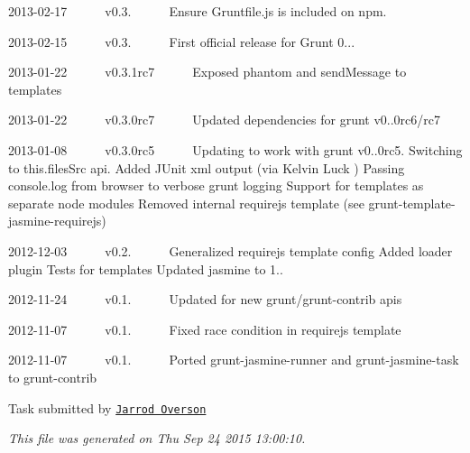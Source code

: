 \begin{DoxyItemize}
\item 2013-\/02-\/17   v0.3.   \+Ensure Gruntfile.\+js is included on npm.
\item 2013-\/02-\/15   v0.3.   \+First official release for Grunt 0...
\item 2013-\/01-\/22   v0.3.\+1rc7   \+Exposed phantom and send\+Message to templates
\item 2013-\/01-\/22   v0.3.\+0rc7   \+Updated dependencies for grunt v0..\+0rc6/rc7
\item 2013-\/01-\/08   v0.3.\+0rc5   \+Updating to work with grunt v0..\+0rc5. Switching to this.\+files\+Src api. Added J\+Unit xml output (via Kelvin Luck ) Passing console.\+log from browser to verbose grunt logging Support for templates as separate node modules Removed internal requirejs template (see grunt-\/template-\/jasmine-\/requirejs)
\item 2012-\/12-\/03   v0.2.   \+Generalized requirejs template config Added loader plugin Tests for templates Updated jasmine to 1..
\item 2012-\/11-\/24   v0.1.   \+Updated for new grunt/grunt-\/contrib apis
\item 2012-\/11-\/07   v0.1.   \+Fixed race condition in requirejs template
\item 2012-\/11-\/07   v0.1.   \+Ported grunt-\/jasmine-\/runner and grunt-\/jasmine-\/task to grunt-\/contrib 


\end{DoxyItemize}

Task submitted by \href{http://jarrodoverson.com}{\tt Jarrod Overson}

{\itshape This file was generated on Thu Sep 24 2015 13\+:00\+:10.} 